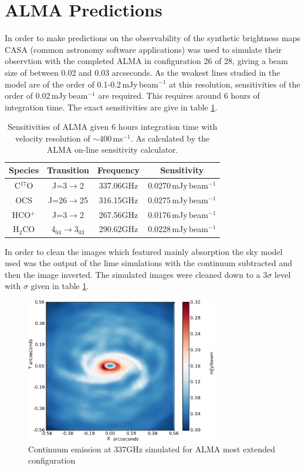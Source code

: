 \documentclass[useAMS,usenatbib]{mn2e}
\begin{document}
\section{ALMA Predictions} \label{sec:alma_predictions}

In order to make predictions on the observability of the synthetic brightness maps CASA (common astronomy software applications) was used to simulate their observtion with the completed ALMA in configuration 26 of 28, giving a beam size of between 0.02 and 0.03 arcseconds. As the weakest lines studied in the model are of the order of 0.1-0.2$\,$mJy$\,$beam$^{-1}$ at this resolution, sensitivities of the order of 0.02$\,$mJy$\,$beam$^{-1}$ are required. This requires around 6 hours of integration time. The exact sensitivities are give in table \ref{sigmas}.
\begin{table}
 \centering
 \begin{minipage}{80mm}
   \caption{Sensitivities of ALMA given 6 hours integration time with velocity resolution of $\sim$400$\,$ms$^{-1}$. As calculated by the ALMA on-line sensitivity calculator.}
   \label{sigmas}
   \begin{tabular}{c||c|c|c}
     \hline
     Species & Transition & Frequency & Sensitivity\\
     \hline
     C$^{17}$O & J=3$\rightarrow$2 & 337.06GHz & 0.0270$\,$mJy$\,$beam$^{-1}$ \\
     OCS & J=26$\rightarrow$25 & 316.15GHz & 0.0275$\,$mJy$\,$beam$^{-1}$ \\
     HCO$^+$ & J=3$\rightarrow$2 & 267.56GHz & 0.0176$\,$mJy$\,$beam$^{-1}$ \\
     H$_2$CO & 4$_{04}\rightarrow$3$_{03}$ & 290.62GHz & 0.0228$\,$mJy$\,$beam$^{-1}$ \\
     \hline
   \end{tabular}
 \end{minipage}
\end{table}
In order to clean the images which featured mainly absorption the sky model used was the output of the lime simulations with the continuum subtracted and then the image inverted. The simulated images were cleaned down to a 3$\sigma$ level with $\sigma$ given in table \ref{sigmas}.\newline

\begin{figure}
 \includegraphics[width=84mm]{Figures/sim/casa_cont_337GHz.eps}

 \caption{Continuum emission at 337GHz simulated for ALMA most extended configuration}
 \label{continuum}
\end{figure}
\end{document}
